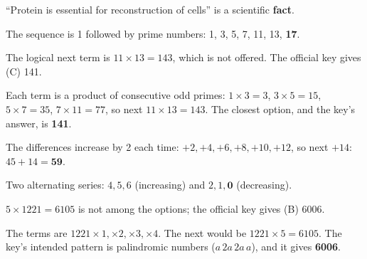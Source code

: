 ``Protein is essential for reconstruction of cells'' is a scientific \textbf{fact}.

The sequence is 1 followed by prime numbers: 1, 3, 5, 7, 11, 13, \textbf{17}.

The logical next term is $11\times13=143$, which is not offered. The official key gives (C) 141.

Each term is a product of consecutive odd primes: $1\times3=3$, $3\times5=15$, $5\times7=35$, $7\times11=77$, so next $11\times13=143$. The closest option, and the key's answer, is \textbf{141}.

The differences increase by 2 each time: $+2, +4, +6, +8, +10, +12$, so next $+14$: $45+14=\mathbf{59}$.

Two alternating series: $4, 5, 6$ (increasing) and $2, 1, \mathbf{0}$ (decreasing).

$5\times1221=6105$ is not among the options; the official key gives (B) 6006.

The terms are $1221\times1, \times2, \times3, \times4$. The next would be $1221\times5=6105$. The key's intended pattern is palindromic numbers ($a\,2a\,2a\,a$), and it gives \textbf{6006}.
